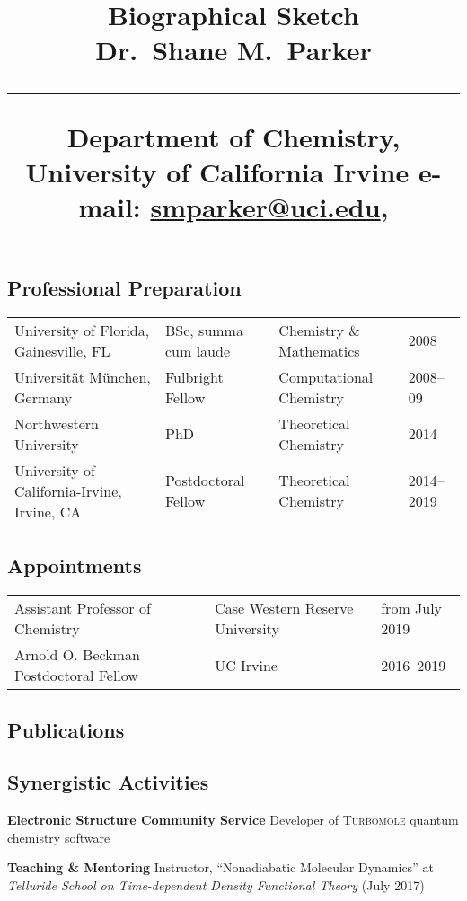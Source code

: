 \documentclass[11pt]{article}
\title{%
        \vspace{-2\baselineskip}
            \normalsize
            Biographical Sketch\\
            {\large\textbf{Dr.~Shane M.~Parker}}\\
            \vspace{0.5\baselineskip}
            \hrule
            \vspace{0.5\baselineskip}
            Department of Chemistry, University of California Irvine
            e-mail: \href{mailto:smparker@uci.edu}{smparker@uci.edu},
        \vspace{-1.5ex}
        }
\date{}
\author{}
\begin{document}
\maketitle
\vspace{-4\baselineskip}

\subsection{Professional Preparation}
\begin{tabular}{llll}
  University of Florida, Gainesville, FL & BSc, summa cum laude & Chemistry \& Mathematics & 2008 \\
  Universit{\"a}t M{\"u}nchen, Germany & Fulbright Fellow & Computational Chemistry & 2008--09 \\
  Northwestern University & PhD & Theoretical Chemistry & 2014 \\
  University of California-Irvine, Irvine, CA & Postdoctoral Fellow & Theoretical Chemistry & 2014--2019 \\
\end{tabular}

\subsection{Appointments}

\begin{tabular}{lll}
  Assistant Professor of Chemistry & Case Western Reserve University & from July 2019 \\
  Arnold O. Beckman Postdoctoral Fellow & UC Irvine & 2016--2019 \\
\end{tabular}

\subsection{Publications}

\begin{bibunit}[nsf]
\renewcommand{\refname}{\vspace{-2em}}
\nocite{Kubota2018,Parker2018JCTC807,Muuronen2017ChemSci2179,Parker2016JCP134105,%
Kim2015JCTC3636,Parker2014JCP211102,Parker2014NanoLett4587,%
Parker2014JPCC12700,Parker2014JCTC3738,Parker2013JCP021108}
\end{bibunit}

\subsection{Synergistic Activities}

\begin{bibenum}[itemsep=4pt]

    \item \textbf{Electronic Structure Community Service} Developer of \textsc{Turbomole} quantum chemistry software
    \item \textbf{Teaching \& Mentoring} Instructor, ``Nonadiabatic Molecular Dynamics'' at
        \emph{Telluride School on Time-dependent Density Functional Theory} (July 2017)

\end{bibenum}
\end{document}
